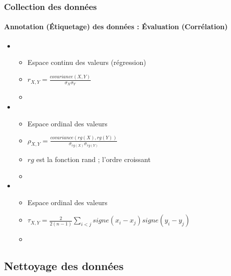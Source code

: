 \documentclass[xcolor=table]{beamer}
\begin{document}
\begin{frame}
	\frametitle{Collection des données}
	\framesubtitle{Annotation (Étiquetage) des données : Évaluation (Corrélation)}
	
	\begin{itemize}
		\item {}
		\begin{itemize}
			\item Espace continu des valeurs (régression)
			\item $r_{X,Y} = \frac{covariance(X,Y)}{\sigma_X \sigma_Y}$
			\item {}
		\end{itemize}
		\item {}
		\begin{itemize}
			\item Espace ordinal des valeurs
			\item $\rho_{X,Y} = \frac{covariance(rg(X),rg(Y))}{\sigma_{rg(X)} \sigma_{rg(Y)}}$
			\item $rg$ est la fonction rand ; l'ordre croissant
			\item {}
		\end{itemize}
		\item {}
		\begin{itemize}
			\item Espace ordinal des valeurs
			\item $\tau_{X,Y} = \frac{2}{2 (n-1)} \sum_{i<j} signe(x_i - x_j) signe(y_i - y_j)$
			\item {}
		\end{itemize}
	\end{itemize}
	
\end{frame}

\subsection{Nettoyage des données}
\end{document}
